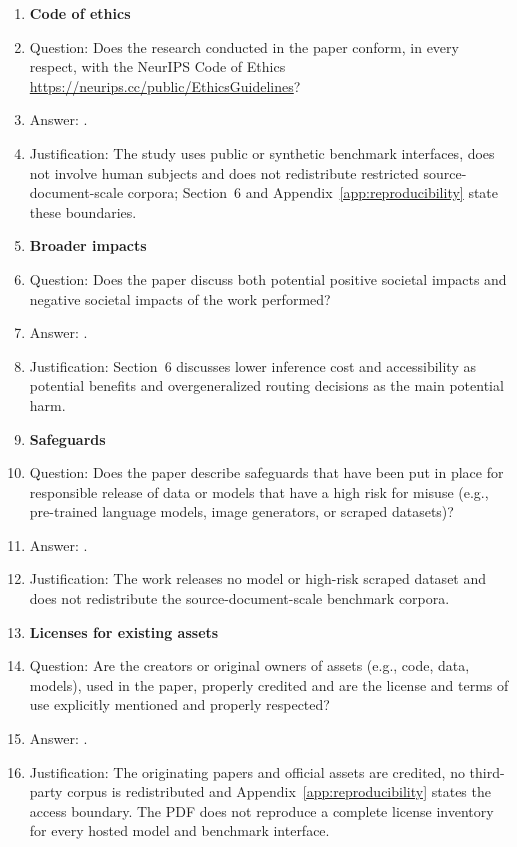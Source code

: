 \begin{enumerate}
\item {\bf Code of ethics}
\item[] Question: Does the research conducted in the paper conform, in every respect, with the NeurIPS Code of Ethics \url{https://neurips.cc/public/EthicsGuidelines}?
\item[] Answer: \answerYes{}.
\item[] Justification: The study uses public or synthetic benchmark interfaces, does not involve human subjects and does not redistribute restricted source-document-scale corpora; Section~6 and Appendix~\ref{app:reproducibility} state these boundaries.

\item {\bf Broader impacts}
\item[] Question: Does the paper discuss both potential positive societal impacts and negative societal impacts of the work performed?
\item[] Answer: \answerYes{}.
\item[] Justification: Section~6 discusses lower inference cost and accessibility as potential benefits and overgeneralized routing decisions as the main potential harm.

\item {\bf Safeguards}
\item[] Question: Does the paper describe safeguards that have been put in place for responsible release of data or models that have a high risk for misuse (e.g., pre-trained language models, image generators, or scraped datasets)?
\item[] Answer: \answerNA{}.
\item[] Justification: The work releases no model or high-risk scraped dataset and does not redistribute the source-document-scale benchmark corpora.

\item {\bf Licenses for existing assets}
\item[] Question: Are the creators or original owners of assets (e.g., code, data, models), used in the paper, properly credited and are the license and terms of use explicitly mentioned and properly respected?
\item[] Answer: \answerNo{}.
\item[] Justification: The originating papers and official assets are credited, no third-party corpus is redistributed and Appendix~\ref{app:reproducibility} states the access boundary. The PDF does not reproduce a complete license inventory for every hosted model and benchmark interface.


\end{enumerate}
